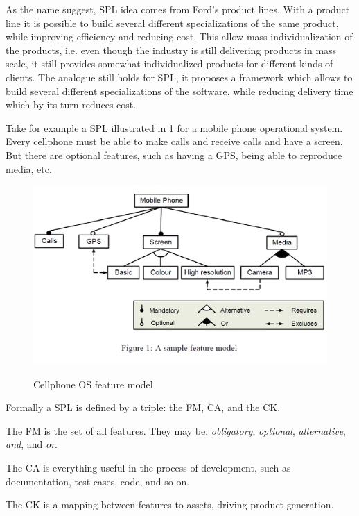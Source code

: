 As the name suggest, \gls{SPL} idea comes from Ford's product lines. With a product line
it is possible to build several different specializations of the same product, while
improving efficiency and reducing cost. This allow mass individualization of the products, i.e. even though the industry is still delivering products in mass scale,
it still provides somewhat individualized products for different kinds of clients.
The analogue still holds for \gls{SPL}, it proposes a framework which allows to build
several different specializations of the software, 
while reducing delivery time which by its turn reduces cost.

Take for example a \gls{SPL} illustrated in \ref{fig:cellphone-fm} for a mobile phone operational system. 
Every cellphone must be able to make calls and receive calls and have a screen. 
But there are optional features, such as having a GPS, being able to reproduce media,
etc.

\begin{figure}
    \centering
    \includegraphics[scale=0.7]{doc/images/mobile-spl}
    \label{fig:cellphone-fm}
    \caption{Cellphone OS feature model} 
\end{figure} 

Formally a \gls{SPL} is defined by a triple: the \gls{FM}, \gls{CA},
and the \gls{CK}.

The \gls{FM} is the set of all features. They may be: \emph{obligatory}, \emph{optional}, \emph{alternative}, \emph{and}, and \emph{or}.

The \gls{CA} is everything useful in the process of development, such as documentation, test cases, code, and so on.

The \gls{CK} is a mapping between features to assets, driving product generation.

